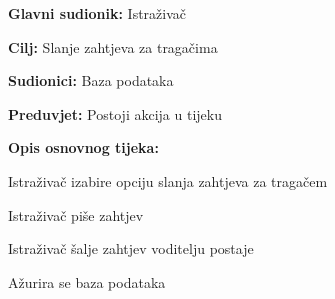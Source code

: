 					\noindent {}
					\begin{packed_item}
	
						\item \textbf{Glavni sudionik: } Istraživač
						\item  \textbf{Cilj:} Slanje zahtjeva za tragačima
						\item  \textbf{Sudionici:} Baza podataka
						\item  \textbf{Preduvjet:} Postoji akcija u tijeku
						\item  \textbf{Opis osnovnog tijeka:}
						
						\item[] \begin{packed_enum}
	
							\item  Istraživač izabire opciju slanja zahtjeva za tragačem
							\item  Istraživač piše zahtjev
							\item  Istraživač šalje zahtjev voditelju postaje
							\item  Ažurira se baza podataka
						
						\end{packed_enum}
					\end{packed_item}
					\noindent {}

